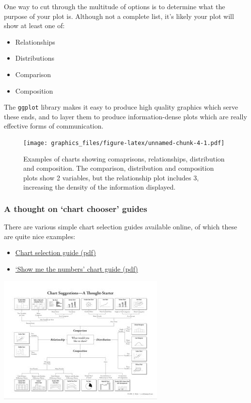 \documentclass[]{article}
\providecommand{\tightlist}{%
  \setlength{\itemsep}{0pt}\setlength{\parskip}{0pt}}
\begin{document}
One way to cut through the multitude of options is to determine what the purpose
of your plot is. Although not a complete list, it's likely your plot will show
at least one of:

\begin{itemize}
\tightlist
\item
  Relationships
\item
  Distributions
\item
  Comparison
\item
  Composition
\end{itemize}

The \texttt{ggplot} library makes it easy to produce high quality graphics which serve
these ends, and to layer them to produce information-dense plots which are
really effective forms of communication.

\begin{figure}
\centering
\texttt{[image: graphics\_files/figure-latex/unnamed-chunk-4-1.pdf]}
\caption{\label{fig:unnamed-chunk-4}Examples of charts showing comaprisons, relationships, distribution and composition. The comparison, distribution and composition plots show 2 variables, but the relationship plot includes 3, increasing the density of the information displayed.}
\end{figure}

\hypertarget{a-thought-on-chart-chooser-guides}{%
\subsubsection*{A thought on `chart chooser' guides}\label{a-thought-on-chart-chooser-guides}}

There are various simple chart selection guides available online, of which these
are quite nice examples:

\begin{itemize}
\tightlist
\item
  \href{http://extremepresentation.typepad.com/blog/2006/09/choosing_a_good.html}{Chart selection guide (pdf)}
\item
  \href{https://www.perceptualedge.com/articles/misc/Graph_Selection_Matrix.pdf}{`Show me the numbers' chart guide (pdf)}
\end{itemize}

\includegraphics{media/choosing_a_good_chart.jpg}
\end{document}

